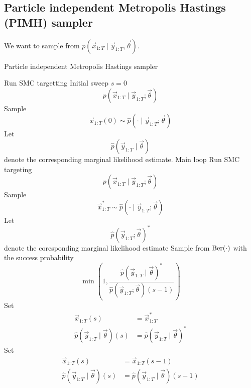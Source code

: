 \subsection{Particle independent Metropolis Hastings (PIMH) sampler}
We want to sample from $p(\vec x_{1:T} \mid \vec y_{1:T}, \vec \theta)$.
    \begin{algorithm}
    \caption{Particle independent Metropolis Hastings sampler}\label{alg:pimh}
        \begin{algorithmic}[1]
            \State Run SMC targetting \Comment Initial sweep $s = 0$
                $$p(\vec x_{1:T} \mid \vec y_{1:T}; \vec \theta)$$
            \State Sample
                $$\vec x_{1:T}(0) \sim \hat p(\cdot \mid \vec y_{1:T}; \vec \theta)$$
            \State Let
                $$\hat p(\vec y_{1:T} \mid \vec \theta)$$
                denote the corresponding marginal likelihood estimate.
             \Comment Main loop
                \State Run SMC targeting
                    $$p(\vec x_{1:T} \mid \vec y_{1:T}; \vec \theta)$$
                \State Sample
                    $$\vec x^\ast_{1:T} \sim \hat p(\cdot \mid \vec y_{1:T}; \vec \theta)$$
                \State Let
                    $$\hat p(\vec y_{1:T}; \vec \theta)^\ast$$
                    denote the coresponding marginal likelihood estimate
                \State Sample from $\operatorname{Ber}(\cdot)$ with the success probability
                    $$\min\left(1, \frac{\hat p(\vec y_{1:T} \mid \vec \theta)^\ast}{\hat p(\vec y_{1:T}; \vec \theta)(s - 1)}\right)$$
                    \State Set
                        \begin{align*}
                            \vec x_{1:T}(s)                             &= \vec x_{1:T}^\ast \\
                            \hat p(\vec y_{1:T} \mid \vec \theta)(s)    &= \hat p(\vec y_{1:T} \mid \vec \theta)^\ast
                        \end{align*}
                \Else
                    \State Set
                        \begin{align*}
                            \vec x_{1:T}(s)                             &= \vec x_{1:T}(s - 1) \\
                            \hat p(\vec y_{1:T} \mid \vec \theta)(s)    &= \hat p(\vec y_{1:T} \mid \vec \theta)(s - 1)
                        \end{align*}
                \EndIf
            \EndFor
        \end{algorithmic}
    \end{algorithm}